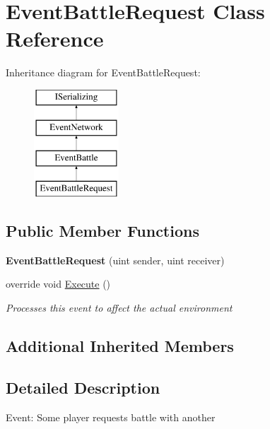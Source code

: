 \hypertarget{class_event_battle_request}{\section{Event\-Battle\-Request Class Reference}
\label{class_event_battle_request}
}
Inheritance diagram for Event\-Battle\-Request\-:\begin{figure}[H]
\begin{center}
\leavevmode
\includegraphics[height=4.000000cm]{class_event_battle_request}
\end{center}
\end{figure}
\subsection*{Public Member Functions}
\begin{DoxyCompactItemize}
\item 
\hypertarget{class_event_battle_request_a2cbe0f2890ad3fa8e00329da6fb79c8f}{{\bfseries Event\-Battle\-Request} (uint sender, uint receiver)}\label{class_event_battle_request_a2cbe0f2890ad3fa8e00329da6fb79c8f}

\item 
override void \hyperlink{class_event_battle_request_a870561ee05467ac4b18b8f9dc0370be9}{Execute} ()
\begin{DoxyCompactList}\small\item\em Processes this event to affect the actual environment \end{DoxyCompactList}\end{DoxyCompactItemize}
\subsection*{Additional Inherited Members}


\subsection{Detailed Description}
Event\-: Some player requests battle with another 

